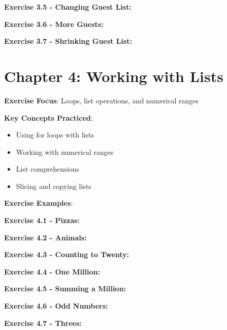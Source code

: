 \textbf{Exercise 3.5 - Changing Guest List:}


\textbf{Exercise 3.6 - More Guests:}


\textbf{Exercise 3.7 - Shrinking Guest List:}


\section*{Chapter 4: Working with Lists}
\textbf{Exercise Focus}: Loops, list operations, and numerical ranges

\textbf{Key Concepts Practiced}:
\begin{itemize}
    \item Using for loops with lists
    \item Working with numerical ranges
    \item List comprehensions
    \item Slicing and copying lists
\end{itemize}

\textbf{Exercise Examples}:

\textbf{Exercise 4.1 - Pizzas:}


\textbf{Exercise 4.2 - Animals:}


\textbf{Exercise 4.3 - Counting to Twenty:}


\textbf{Exercise 4.4 - One Million:}


\textbf{Exercise 4.5 - Summing a Million:}


\textbf{Exercise 4.6 - Odd Numbers:}


\textbf{Exercise 4.7 - Threes:}


